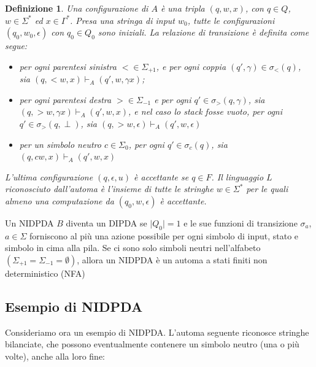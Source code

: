 \documentclass[a4paper,12pt]{report}
\newtheorem{definition}{Definizione}[chapter]
\theoremstyle{propositionstyle}
\begin{document}
    \begin{definition}
        \label{def:configuration-non-det}
        Una configurazione di $A$ è una tripla $\left(q, w, x\right)$, con $q \in Q$, $w \in \Sigma^*$ ed $x \in \Gamma^*$.
        Presa una stringa di input $w_0$, tutte le configurazioni $(q_0, w_0, \epsilon)$ con $q_0 \in Q_0$ sono iniziali.
        La relazione di transizione è definita come segue:

        \begin{itemize}
            \item per ogni parentesi sinistra $< \in \Sigma_{+1}$, e per ogni coppia $\left(q', \gamma\right) \in \sigma_<\left(q\right)$, sia $(q, <w, x) \vdash_{A} (q', w, \gamma x)$;
            \item per ogni parentesi destra $> \in \Sigma_{-1}$ e per ogni $q' \in \sigma_>\left(q, \gamma\right)$, sia $(q, >w, \gamma x) \vdash_{A} (q', w, x)$, e nel caso lo stack fosse vuoto, per ogni $q' \in \sigma_>\left(q, \perp\right)$, sia $\left(q, >w, \epsilon\right) \vdash_{A} \left(q', w, \epsilon\right)$
            \item per un simbolo neutro $c \in \Sigma_0$, per ogni $q' \in \sigma_c\left(q\right)$, sia $\left(q, cw, x\right) \vdash_{A} \left(q', w, x\right)$
        \end{itemize}

        L'ultima configurazione $\left(q, \epsilon, u\right)$ è accettante se $q \in F$.
        Il linguaggio $L$ riconosciuto dall'automa è l'insieme di tutte le stringhe $w \in \Sigma^*$ per le quali almeno una computazione da $\left(q_0, w, \epsilon\right)$ è accettante.

    \end{definition}

    Un NIDPDA $B$ diventa un DIPDA se $\lvert Q_0\rvert = 1$ e le sue funzioni di transizione $\sigma_a$, $a \in \Sigma$ forniscono al più una azione possibile per ogni simbolo di input, stato e simbolo in cima alla pila.
    Se ci sono solo simboli neutri nell'alfabeto $\left(\Sigma_{+1} = \Sigma_{-1} = \emptyset\right)$, allora un NIDPDA è un automa a stati finiti non deterministico (NFA)

    \subsection{Esempio di NIDPDA}

    Consideriamo ora un esempio di NIDPDA. L'automa seguente riconosce stringhe bilanciate, che possono eventualmente contenere un simbolo neutro (una o più volte), anche alla loro fine:
\end{document}
